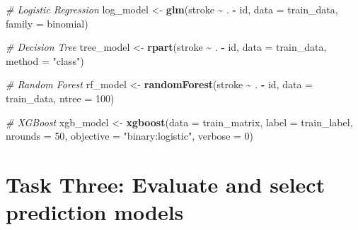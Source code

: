 \documentclass[
]{article}
\newenvironment{Shaded}{\begin{snugshade}}{\end{snugshade}}
\newcommand{\AttributeTok}[1]{\textcolor[rgb]{0.13,0.29,0.53}{#1}}
\newcommand{\CommentTok}[1]{\textcolor[rgb]{0.56,0.35,0.01}{\textit{#1}}}
\newcommand{\DecValTok}[1]{\textcolor[rgb]{0.00,0.00,0.81}{#1}}
\newcommand{\FloatTok}[1]{\textcolor[rgb]{0.00,0.00,0.81}{#1}}
\newcommand{\FunctionTok}[1]{\textcolor[rgb]{0.13,0.29,0.53}{\textbf{#1}}}
\newcommand{\NormalTok}[1]{#1}
\newcommand{\OtherTok}[1]{\textcolor[rgb]{0.56,0.35,0.01}{#1}}
\newcommand{\SpecialCharTok}[1]{\textcolor[rgb]{0.81,0.36,0.00}{\textbf{#1}}}
\newcommand{\StringTok}[1]{\textcolor[rgb]{0.31,0.60,0.02}{#1}}
\begin{document}
\begin{Shaded}
\begin{Highlighting}[]
\CommentTok{\# Logistic Regression}
\NormalTok{log\_model }\OtherTok{\textless{}{-}} \FunctionTok{glm}\NormalTok{(stroke }\SpecialCharTok{\textasciitilde{}}\NormalTok{ . }\SpecialCharTok{{-}}\NormalTok{ id, }\AttributeTok{data =}\NormalTok{ train\_data, }\AttributeTok{family =}\NormalTok{ binomial)}

\CommentTok{\# Decision Tree}
\NormalTok{tree\_model }\OtherTok{\textless{}{-}} \FunctionTok{rpart}\NormalTok{(stroke }\SpecialCharTok{\textasciitilde{}}\NormalTok{ . }\SpecialCharTok{{-}}\NormalTok{ id, }\AttributeTok{data =}\NormalTok{ train\_data, }\AttributeTok{method =} \StringTok{"class"}\NormalTok{)}

\CommentTok{\# Random Forest}
\NormalTok{rf\_model }\OtherTok{\textless{}{-}} \FunctionTok{randomForest}\NormalTok{(stroke }\SpecialCharTok{\textasciitilde{}}\NormalTok{ . }\SpecialCharTok{{-}}\NormalTok{ id, }\AttributeTok{data =}\NormalTok{ train\_data, }\AttributeTok{ntree =} \DecValTok{100}\NormalTok{)}

\CommentTok{\# XGBoost}
\NormalTok{xgb\_model }\OtherTok{\textless{}{-}} \FunctionTok{xgboost}\NormalTok{(}\AttributeTok{data =}\NormalTok{ train\_matrix, }\AttributeTok{label =}\NormalTok{ train\_label, }
                     \AttributeTok{nrounds =} \DecValTok{50}\NormalTok{, }\AttributeTok{objective =} \StringTok{"binary:logistic"}\NormalTok{, }\AttributeTok{verbose =} \DecValTok{0}\NormalTok{)}
\end{Highlighting}
\end{Shaded}

\section{Task Three: Evaluate and select prediction
models}\label{task-three-evaluate-and-select-prediction-models}

\begin{Shaded}
\end{Shaded}
\end{document}
